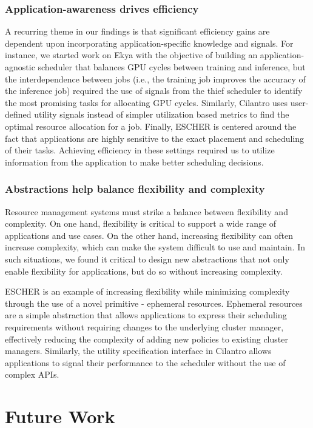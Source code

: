 \subsubsection{Application-awareness drives efficiency}
A recurring theme in our findings is that significant efficiency gains are dependent upon incorporating application-specific knowledge and signals.  For instance, we started work on Ekya with the objective of building an application-agnostic scheduler that balances GPU cycles between training and inference, but the interdependence between jobs (i.e., the training job improves the accuracy of the inference job) required the use of signals from the thief scheduler to identify the most promising tasks for allocating GPU cycles. Similarly, Cilantro uses user-defined utility signals instead of simpler utilization based metrics to find the optimal resource allocation for a job. Finally, ESCHER is centered around the fact that applications are highly sensitive to the exact placement and scheduling of their tasks. Achieving efficiency in these settings required us to utilize information from the application to make better scheduling decisions.

\subsubsection{Abstractions help balance flexibility and complexity}
Resource management systems must strike a balance between flexibility and complexity. On one hand, flexibility is critical to support a wide range of applications and use cases. On the other hand, increasing flexibility can often increase complexity, which can make the system difficult to use and maintain. In such situations, we found it critical to design new abstractions that not only enable flexibility for applications, but do so  without increasing complexity. 

ESCHER is an example of increasing flexibility while minimizing complexity through the use of a novel primitive - ephemeral resources. Ephemeral resources are a simple abstraction that allows applications to express their scheduling requirements without requiring changes to the underlying cluster manager, effectively reducing the complexity of adding new policies to existing cluster managers. Similarly, the utility specification interface in Cilantro allows applications to signal their performance to the scheduler without the use of complex APIs. 

\section{Future Work}

